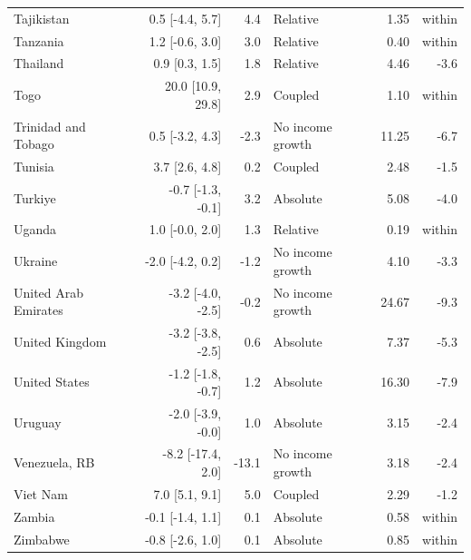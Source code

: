 \begin{longtable}{@{}lrrlrr@{}}
Tajikistan & 0.5 [-4.4, 5.7] & 4.4 & Relative & 1.35 & within \\
Tanzania & 1.2 [-0.6, 3.0] & 3.0 & Relative & 0.40 & within \\
Thailand & 0.9 [0.3, 1.5] & 1.8 & Relative & 4.46 & -3.6 \\
Togo & 20.0 [10.9, 29.8] & 2.9 & Coupled & 1.10 & within \\
Trinidad and Tobago & 0.5 [-3.2, 4.3] & -2.3 & No income growth & 11.25 & -6.7 \\
Tunisia & 3.7 [2.6, 4.8] & 0.2 & Coupled & 2.48 & -1.5 \\
Turkiye & -0.7 [-1.3, -0.1] & 3.2 & Absolute & 5.08 & -4.0 \\
Uganda & 1.0 [-0.0, 2.0] & 1.3 & Relative & 0.19 & within \\
Ukraine & -2.0 [-4.2, 0.2] & -1.2 & No income growth & 4.10 & -3.3 \\
United Arab Emirates & -3.2 [-4.0, -2.5] & -0.2 & No income growth & 24.67 & -9.3 \\
United Kingdom & -3.2 [-3.8, -2.5] & 0.6 & Absolute & 7.37 & -5.3 \\
United States & -1.2 [-1.8, -0.7] & 1.2 & Absolute & 16.30 & -7.9 \\
Uruguay & -2.0 [-3.9, -0.0] & 1.0 & Absolute & 3.15 & -2.4 \\
Venezuela, RB & -8.2 [-17.4, 2.0] & -13.1 & No income growth & 3.18 & -2.4 \\
Viet Nam & 7.0 [5.1, 9.1] & 5.0 & Coupled & 2.29 & -1.2 \\
Zambia & -0.1 [-1.4, 1.1] & 0.1 & Absolute & 0.58 & within \\
Zimbabwe & -0.8 [-2.6, 1.0] & 0.1 & Absolute & 0.85 & within \\
\end{longtable}
\vspace{-6pt}
\endgroup
